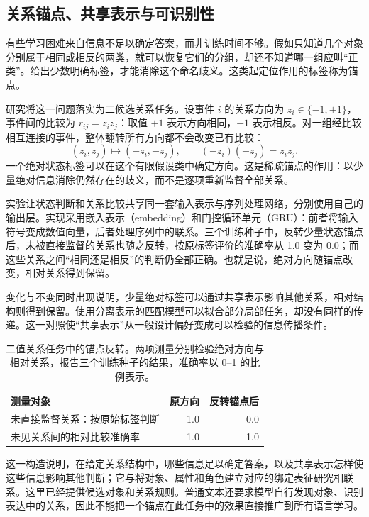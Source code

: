 \subsection{关系锚点、共享表示与可识别性}
\label{sec:anchors}

有些学习困难来自信息不足以确定答案，而非训练时间不够。假如只知道几个对象分别属于相同或相反的两类，就可以恢复它们的分组，却还不知道哪一组应叫“正类”。给出少数明确标签，才能消除这个命名歧义。这类起定位作用的标签称为锚点。

研究将这一问题落实为二候选关系任务。设事件 $i$ 的关系方向为 $z_i\in\{-1,+1\}$，事件间的比较为 $r_{ij}=z_i z_j$：取值 $+1$ 表示方向相同，$-1$ 表示相反。对一组经比较相互连接的事件，整体翻转所有方向都不会改变已有比较：
\begin{equation}
 (z_i,z_j)\mapsto(-z_i,-z_j),\qquad
 (-z_i)(-z_j)=z_i z_j.
\end{equation}
一个绝对状态标签可以在这个有限假设类中确定方向。这是稀疏锚点的作用：以少量绝对信息消除仍然存在的歧义，而不是逐项重新监督全部关系。

实验让状态判断和关系比较共享同一套输入表示与序列处理网络，分别使用自己的输出层。实现采用嵌入表示（embedding）和门控循环单元（GRU）：前者将输入符号变成数值向量，后者处理序列中的联系。三个训练种子中，反转少量状态锚点后，未被直接监督的关系也随之反转，按原标签评价的准确率从 1.0 变为 0.0；而这些关系之间“相同还是相反”的判断仍全部正确。也就是说，绝对方向随锚点改变，相对关系得到保留。

变化与不变同时出现说明，少量绝对标签可以通过共享表示影响其他关系，相对结构则得到保留。使用分离表示的匹配模型可以拟合部分局部任务，却没有同样的传递。这一对照使“共享表示”从一般设计偏好变成可以检验的信息传播条件。

\begin{table}[htbp]
\caption{二值关系任务中的锚点反转。两项测量分别检验绝对方向与相对关系，报告三个训练种子的结果，准确率以 0--1 的比例表示。}
\label{tab:anchor}
\begin{tabularx}{\linewidth}{@{}Yrr@{}}
\toprule 测量对象 & 原方向 & 反转锚点后\\\midrule
未直接监督关系：按原始标签判断 & 1.0 & 0.0\\
未见关系间的相对比较准确率 & 1.0 & 1.0\\
\bottomrule
\end{tabularx}
\end{table}

这一构造说明，在给定关系结构中，哪些信息足以确定答案，以及共享表示怎样使这些信息影响其他判断；它与将对象、属性和角色建立对应的绑定表征研究相联系\citep{feng2024binding,dai2024binding}。这里已经提供候选对象和关系规则。普通文本还要求模型自行发现对象、识别表达中的关系，因此不能把一个锚点在此任务中的效果直接推广到所有语言学习。

